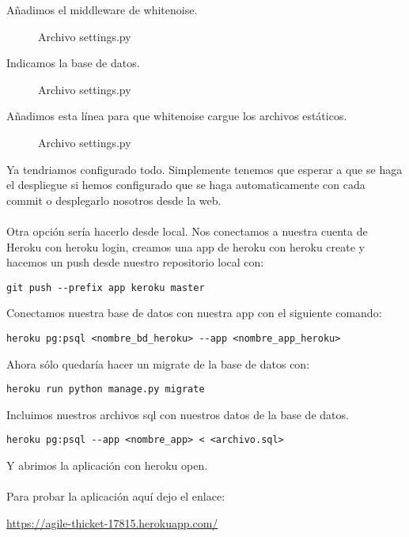 Añadimos el middleware de whitenoise.

\begin{figure}[H]
  \centering
  \noindent{}
  \caption{Archivo settings.py}
\end{figure}

Indicamos la base de datos.

\begin{figure}[H]
  \centering
  \noindent{}
  \caption{Archivo settings.py}
\end{figure}

Añadimos esta línea para que whitenoise cargue los archivos estáticos.

\begin{figure}[H]
  \centering
  \noindent{}
  \caption{Archivo settings.py}
\end{figure}

Ya tendriamos configurado todo. Simplemente tenemos que esperar a que se haga el despliegue si hemos configurado que se haga automaticamente con cada commit o desplegarlo nosotros desde la web.\\\\

Otra opción sería hacerlo desde local.
Nos conectamos a nuestra cuenta de Heroku con heroku login, creamos una app de heroku con heroku create y hacemos un push desde nuestro repositorio local con:
\begin{lstlisting}
git push --prefix app keroku master
\end{lstlisting}

Conectamos nuestra base de datos con nuestra app con el siguiente comando:
\begin{lstlisting}
heroku pg:psql <nombre_bd_heroku> --app <nombre_app_heroku>
\end{lstlisting}

Ahora sólo quedaría hacer un migrate de la base de datos con:
\begin{lstlisting}
heroku run python manage.py migrate
\end{lstlisting}

Incluimos nuestros archivos sql con nuestros datos de la base de datos.
\begin{lstlisting}
heroku pg:psql --app <nombre_app> < <archivo.sql>
\end{lstlisting}
Y abrimos la aplicación con heroku open.\\\\

Para probar la aplicación aquí dejo el enlace:

\url{https://agile-thicket-17815.herokuapp.com/}